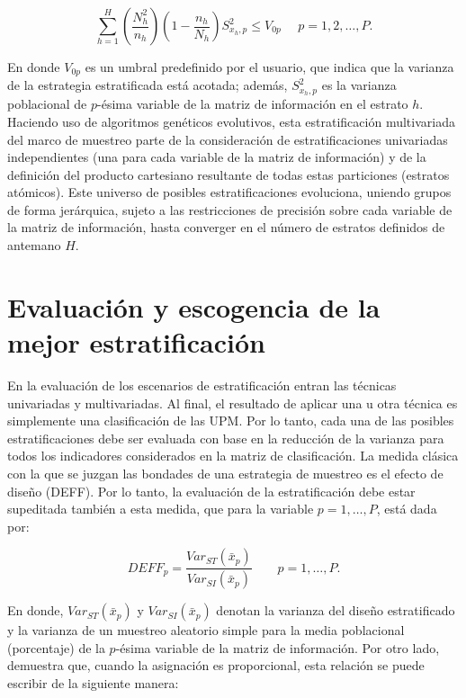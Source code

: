 \documentclass[
  12pt,
  spanish,
]{book}
\begin{document}
\[
\sum_{h=1}^{H} \left(\frac{N_h^2}{n_h}\right)\left(1-\frac{n_h}{N_h}\right) S^2_{x_h,p} \leq V_{0p}\ \ \  \ \ \ p = 1, 2, \ldots, P.
\]

En donde \(V_{0p}\) es un umbral predefinido por el usuario, que indica que la varianza de la estrategia estratificada está acotada; además, \(S^2_{x_h,p}\) es la varianza poblacional de \(p\)-ésima variable de la matriz de información en el estrato \(h\).
Haciendo uso de algoritmos genéticos evolutivos, esta estratificación multivariada del marco de muestreo parte de la consideración de estratificaciones univariadas independientes (una para cada variable de la matriz de información) y de la definición del producto cartesiano resultante de todas estas particiones (estratos atómicos). Este universo de posibles estratificaciones evoluciona, uniendo grupos de forma jerárquica, sujeto a las restricciones de precisión sobre cada variable de la matriz de información, hasta converger en el número de estratos definidos de antemano \(H\).

\hypertarget{evaluaciuxf3n-y-escogencia-de-la-mejor-estratificaciuxf3n}{%
\section{Evaluación y escogencia de la mejor estratificación}\label{evaluaciuxf3n-y-escogencia-de-la-mejor-estratificaciuxf3n}}

En la evaluación de los escenarios de estratificación entran las técnicas univariadas y multivariadas. Al final, el resultado de aplicar una u otra técnica es simplemente una clasificación de las UPM. Por lo tanto, cada una de las posibles estratificaciones debe ser evaluada con base en la reducción de la varianza para todos los indicadores considerados en la matriz de clasificación. La medida clásica con la que se juzgan las bondades de una estrategia de muestreo es el efecto de diseño (DEFF). Por lo tanto, la evaluación de la estratificación debe estar supeditada también a esta medida, que para la variable \(p = 1, \ldots, P\), está dada por:

\[
DEFF_p = \frac{Var_{ST}(\bar x _p)}{Var_{SI}(\bar x _p)} \ \ \ \ \ \ \ \ \ p = 1, \ldots, P.
\]

En donde, \(Var_{ST}(\bar x _p)\) y \(Var_{SI}(\bar x _p)\) denotan la varianza del diseño estratificado y la varianza de un muestreo aleatorio simple para la media poblacional (porcentaje) de la \(p\)-ésima variable de la matriz de información. Por otro lado, \citet[página 184]{Gutierrez_2016} demuestra que, cuando la asignación es proporcional, esta relación se puede escribir de la siguiente manera:
\end{document}
